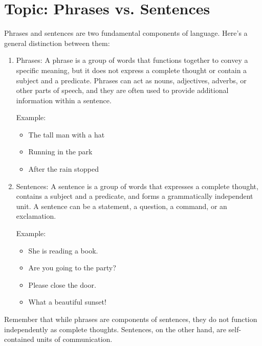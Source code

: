 \documentclass{article}
\begin{document}
\section*{Topic: Phrases vs. Sentences}
Phrases and sentences are two fundamental components of language. Here's a general distinction between them:
\begin{enumerate}
    \item Phrases:
    A phrase is a group of words that functions together to convey a specific meaning, but it does not express a complete thought or contain a subject and a predicate. Phrases can act as nouns, adjectives, adverbs, or other parts of speech, and they are often used to provide additional information within a sentence.
    
    Example:
    \begin{itemize}
        \item The tall man with a hat
        \item Running in the park
        \item After the rain stopped
    \end{itemize}
    \item Sentences:
    A sentence is a group of words that expresses a complete thought, contains a subject and a predicate, and forms a grammatically independent unit. A sentence can be a statement, a question, a command, or an exclamation.
    
    Example:
    \begin{itemize}
        \item She is reading a book.
        \item Are you going to the party?
        \item Please close the door.
        \item What a beautiful sunset!
    \end{itemize}
\end{enumerate}

Remember that while phrases are components of sentences, they do not function independently as complete thoughts. Sentences, on the other hand, are self-contained units of communication.
\end{document}
